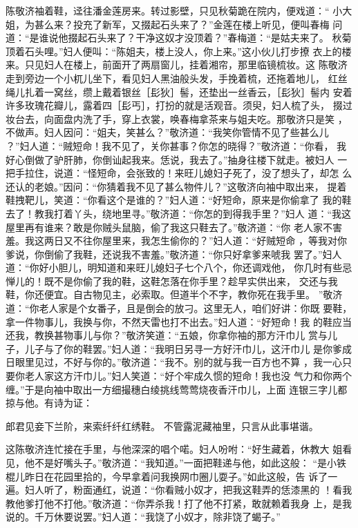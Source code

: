 陈敬济袖着鞋，迳往潘金莲房来。转过影壁，只见秋菊跪在院内，便戏道：“
小大姐，为甚么来？投充了新军，又掇起石头来了？”金莲在楼上听见，便叫春梅
问道：“是谁说他掇起石头来了？干净这奴才没顶着？”春梅道：“是姑夫来了。
秋菊顶着石头哩。”妇人便叫：“陈姐夫，楼上没人，你上来。”这小伙儿打步撩
衣上的楼来。只见妇人在楼上，前面开了两扇窗儿，挂着湘帘，那里临镜梳妆。这
陈敬济走到旁边一个小杌儿坐下，看见妇人黑油般头发，手挽着梳，还拖着地儿，
红丝绳儿扎着一窝丝，缵上戴着银丝［髟狄］髻，还垫出一丝香云，［髟狄］髻内
安着许多玫瑰花瓣儿，露着四［髟丐］，打扮的就是活观音。须臾，妇人梳了头，
掇过妆台去，向面盘内洗了手，穿上衣裳，唤春梅拿茶来与姐夫吃。那敬济只是笑
，不做声。妇人因问：“姐夫，笑甚么？”敬济道：“我笑你管情不见了些甚么儿
？”妇人道：“贼短命！我不见了，关你甚事？你怎的晓得？”敬济道：“你看，
我好心倒做了驴肝肺，你倒讪起我来。恁说，我去了。”抽身往楼下就走。被妇人
一把手拉住，说道：“怪短命，会张致的！来旺儿媳妇子死了，没了想头了，却怎
么还认的老娘。”因问：“你猜着我不见了甚么物件儿？”这敬济向袖中取出来，
提着鞋拽靶儿，笑道：“你看这个是谁的？”妇人道：“好短命，原来是你偷拿了
我的鞋去了！教我打着丫头，绕地里寻。”敬济道：“你怎的到得我手里？”妇人
道：“我这屋里再有谁来？敢是你贼头鼠脑，偷了我这只鞋去了。”敬济道：“你
老人家不害羞。我这两日又不往你屋里来，我怎生偷你的？”妇人道：“好贼短命
，等我对你爹说，你倒偷了我鞋，还说我不害羞。”敬济道：“你只好拿爹来唬我
罢了。”妇人道：“你好小胆儿，明知道和来旺儿媳妇子七个八个，你还调戏他，
你几时有些忌惮儿的！既不是你偷了我的鞋，这鞋怎落在你手里？趁早实供出来，
交还与我鞋，你还便宜。自古物见主，必索取。但道半个不字，教你死在我手里。
”敬济道：“你老人家是个女番子，且是倒会的放刁。这里无人，咱们好讲：你既
要鞋，拿一件物事儿，我换与你，不然天雷也打不出去。”妇人道：“好短命！我
的鞋应当还我，教换甚物事儿与你？”敬济笑道：“五娘，你拿你袖的那方汗巾儿
赏与儿子，儿子与了你的鞋罢。”妇人道：“我明日另寻一方好汗巾儿，这汗巾儿
是你爹成日眼里见过，不好与你的。”敬济道：“我不。别的就与我一百方也不算
，我一心只要你老人家这方汗巾儿。”妇人笑道：“好个牢成久惯的短命！我也没
气力和你两个缠。”于是向袖中取出一方细撮穗白绫挑线莺莺烧夜香汗巾儿，上面
连银三字儿都掠与他。有诗为证：

郎君见妾下兰阶，来索纤纤红绣鞋。
不管露泥藏袖里，只言从此事堪谐。

这陈敬济连忙接在手里，与他深深的唱个喏。妇人吩咐：“好生藏着，休教大
姐看见，他不是好嘴头子。”敬济道：“我知道。”一面把鞋递与他，如此这般：
“是小铁棍儿昨日在花园里拾的，今早拿着问我换网巾圈儿耍子。”如此这般，告
诉了一遍。妇人听了，粉面通红，说道：“你看贼小奴才，把我这鞋弄的恁漆黑的
！看我教他爹打他不打他。”敬济道：“你弄杀我！打了他不打紧，敢就赖着我身
上，是我说的。千万休要说罢。”妇人道：“我饶了小奴才，除非饶了蝎子。”

